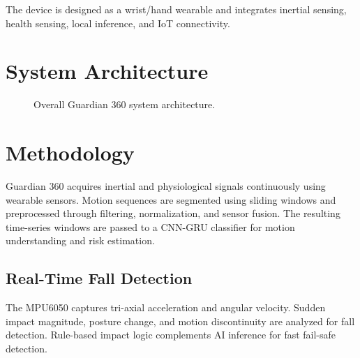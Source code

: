 \documentclass[conference]{IEEEtran}
\begin{document}
The device is designed as a wrist/hand wearable and integrates inertial sensing, health sensing, local inference, and IoT connectivity.

\section{System Architecture}
\begin{figure}[!t]
\centering
{}
\caption{Overall Guardian 360 system architecture.}
\label{fig:overall}
\end{figure}

\section{Methodology}
Guardian 360 acquires inertial and physiological signals continuously using wearable sensors. Motion sequences are segmented using sliding windows and preprocessed through filtering, normalization, and sensor fusion. The resulting time-series windows are passed to a CNN-GRU classifier for motion understanding and risk estimation.

\subsection{Real-Time Fall Detection}
The MPU6050 captures tri-axial acceleration and angular velocity. Sudden impact magnitude, posture change, and motion discontinuity are analyzed for fall detection. Rule-based impact logic complements AI inference for fast fail-safe detection.
\end{document}
